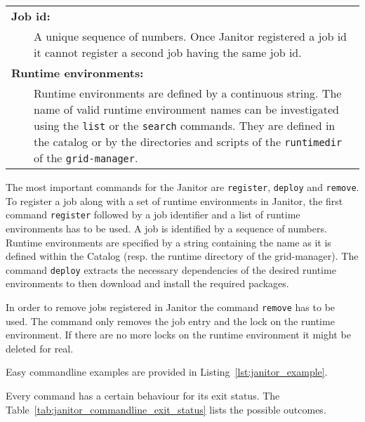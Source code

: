 \begin{table}[!h]
\begin{center}
\begin{tabular}{p{0.5cm}p{2cm}p{11cm}}
	\multicolumn{3}{l}{\textbf{Job id:}}\\
	&					& A unique sequence of numbers. Once Janitor registered a job id it cannot register a second job having the same job id.\\
	\multicolumn{3}{l}{\textbf{Runtime environments:}}\\
	&					& Runtime environments are defined by a continuous string. The name of valid runtime environment names can be investigated using the \texttt{list} or the \texttt{search} commands. They are defined in the catalog or by the directories and scripts of the \texttt{runtimedir} of the \texttt{grid-manager}.\\
	\end{tabular} 
   \end{center}
\end{table}
The most important commands for the Janitor are \texttt{register}, \texttt{deploy} and \texttt{remove}. To 
register a job along with a set of runtime environments in Janitor, the first command \texttt{register} followed
by a job identifier and a list of runtime environments has to be used.
A job is identified by a sequence of numbers. Runtime environments are specified by a string containing the name as it is defined 
within the Catalog (resp. the runtime directory of the grid-manager).
The command \texttt{deploy} extracts the necessary dependencies of the desired runtime environments to then download and install
the required packages. %

In order to remove jobs registered in Janitor the command \texttt{remove} has to be used. 
The command only removes the job entry and the lock on the runtime environment. If there are no more locks on the runtime environment
it might be deleted for real.

Easy commandline examples are provided in Listing~\ref{lst:janitor_example}.

Every command has a certain behaviour for its exit status. The Table~\ref{tab:janitor_commandline_exit_status} lists the possible
outcomes.

